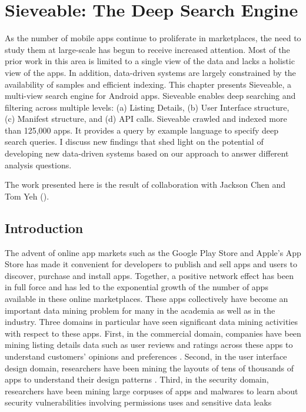 \chapter{Sieveable: The Deep Search Engine}
\label{ch:sieveable_chapter}
As the number of mobile apps continue to proliferate in marketplaces, the need to study them at large-scale has begun to receive increased attention. 
Most of the prior work in this area is limited to a single view of the data  and lacks a  holistic view of the apps. 
In addition, data-driven systems are largely constrained by the availability of samples and efficient indexing.
This chapter presents Sieveable, a multi-view search engine for Android apps.
Sieveable enables deep searching and filtering across multiple levels: (a) Listing Details, (b) User Interface structure, (c) Manifest structure, and (d) API calls. 
Sieveable crawled and indexed more than 125,000 apps. 
It provides a query by example language to specify deep search queries. 
I discuss new findings that shed light on the potential of developing new data-driven systems based on our approach to answer different analysis questions.

The work presented here is the result of collaboration with Jackson Chen and Tom Yeh (\cite{Alharbi_2015_VLDB}).

\section{Introduction}

The advent of online app markets such as the Google Play Store and Apple's App Store has made it convenient for developers to publish and sell apps and users to discover, purchase and install apps. 
Together, a positive network effect has been in full force and has led to the exponential growth of the number of apps available in these online marketplaces.
These apps collectively have become an important data mining problem for many in the academia as well as in the industry.
Three domains in particular have seen significant data mining activities with respect to these apps.
First, in the commercial domain, companies have been mining listing details data such as user reviews and ratings across these apps to understand customers' opinions and preferences \cite{appbrain,apptrace}.
Second, in the user interface design domain, researchers have been mining the layouts of tens of thousands of apps to understand their design patterns \cite{Alharbi_2015_MobileHCI}.
Third, in the security domain, researchers have been mining large corpuses of apps and malwares to learn about security vulnerabilities involving permissions uses \cite{zhou_2012_SP_dissecting} and sensitive data leaks \cite{Arzt_2014_PLDI}

